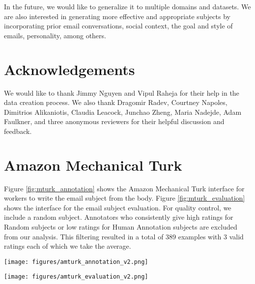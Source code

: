 \documentclass[11pt,a4paper]{article}
\begin{document}
In the future, we would like to generalize it to multiple domains and datasets.
We are also interested in generating more effective and appropriate subjects by incorporating prior email conversations, social context, the goal and style of emails, personality, among others.

\section*{Acknowledgements}
We would like to thank Jimmy Nguyen and Vipul Raheja for their help in the data creation process. 
We also thank Dragomir Radev, Courtney Napoles, Dimitrios Alikaniotis, Claudia Leacock, Junchao Zheng, Maria Nadejde, Adam Faulkner, and three anonymous reviewers for their helpful discussion and feedback.




\appendix
\section{Amazon Mechanical Turk}
Figure \ref{fig:mturk_annotation} shows the Amazon Mechanical Turk interface for workers to write the email subject from the body.
Figure \ref{fig:mturk_evaluation} shows the interface for the email subject evaluation.
For quality control, we include a random subject.
Annotators who consistently give high ratings for Random subjects or low ratings for Human Annotation subjects are excluded from our analysis.  This filtering resulted in a total of 389 examples with 3 valid ratings each of which we take the average.
\begin{figure*}[t]
  \centering
  \texttt{[image: figures/amturk\_annotation\_v2.png]}
  \caption{Amazon Mechanical Turk job interface for the email subject annotation.}
  \label{fig:mturk_annotation}
\end{figure*}

\begin{figure*}[t]
  \centering
  \texttt{[image: figures/amturk\_evaluation\_v2.png]}
  \caption{Amazon Mechanical Turk job interface for the email subject evaluation. All the other system outputs are in the same job but are not shown here for brevity.}
  \label{fig:mturk_evaluation}
\end{figure*}
\end{document}
